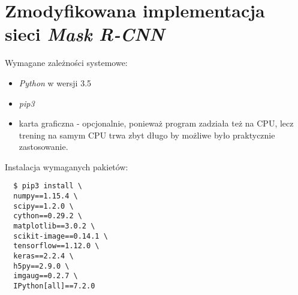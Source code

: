 \section*{Zmodyfikowana implementacja sieci \textit{Mask R-CNN}}

Wymagane zależności systemowe:

\begin{itemize}
  \item \textit{Python} \cite{python} w wersji 3.5
  \item \textit{pip3} \cite{pip}
  \item karta graficzna - opcjonalnie, ponieważ program zadziała też na CPU, lecz trening na samym CPU trwa zbyt długo by możliwe było praktycznie zastosowanie.
\end{itemize}

Instalacja wymaganych pakietów:

\begin{verbatim}
  $ pip3 install \
  numpy==1.15.4 \
  scipy==1.2.0 \
  cython==0.29.2 \
  matplotlib==3.0.2 \
  scikit-image==0.14.1 \
  tensorflow==1.12.0 \
  keras==2.2.4 \
  h5py==2.9.0 \
  imgaug==0.2.7 \
  IPython[all]==7.2.0
\end{verbatim}